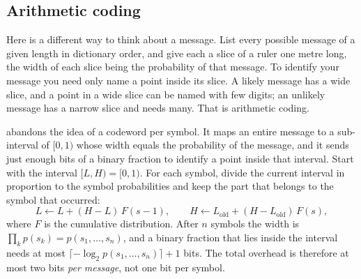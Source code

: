 \subsection{Arithmetic coding}

Here is a different way to think about a message. List every possible message of a given length
in dictionary order, and give each a slice of a ruler one metre long, the width of each slice
being the probability of that message. To identify your message you need only name a point inside
its slice. A likely message has a wide slice, and a point in a wide slice can be named with few
digits; an unlikely message has a narrow slice and needs many. That is arithmetic coding.


 abandons the idea of a codeword per symbol. It maps an entire message to
a sub-interval of $[0,1)$ whose width equals the probability of the message, and it sends just
enough bits of a binary fraction to identify a point inside that interval. Start with the interval
$[L,H)=[0,1)$. For each symbol, divide the current interval in proportion to the symbol
probabilities and keep the part that belongs to the symbol that occurred:
\begin{equation}
L\leftarrow L+(H-L)\,F(s-1),\qquad H\leftarrow L_{\text{old}}+(H-L_{\text{old}})\,F(s),
\label{eq:ch16:arith}
\end{equation}
where $F$ is the cumulative distribution. After $n$ symbols the width is
$\prod_kp(s_k)=p(s_1,\dots,s_n)$, and a binary fraction that lies inside the interval needs at most
$\lceil-\log_2p(s_1,\dots,s_n)\rceil+1$ bits. The total overhead is therefore at most two bits
\emph{per message}, not one bit per symbol.


